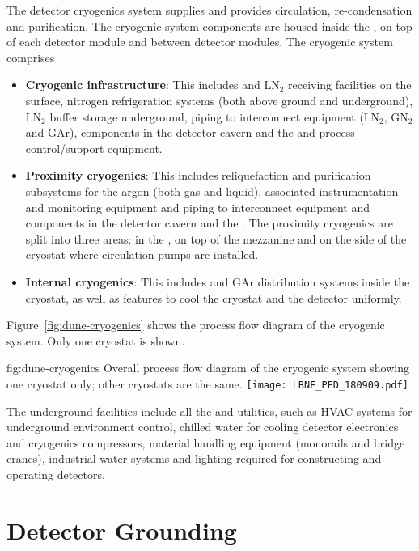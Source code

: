 The detector cryogenics system supplies  and provides
circulation, re-condensation and purification. The cryogenic system
components are housed inside the , on top of each detector module
and between detector modules. The cryogenic system comprises
\begin{itemize}
\item {\bf Cryogenic infrastructure}: This includes  and LN$_2$ receiving
  facilities on the surface, nitrogen refrigeration systems (both
  above ground and underground), LN$_2$ buffer storage
  underground, piping to interconnect equipment (LN$_2$, GN$_2$ and GAr),
  components in the detector cavern and the  and process control/support
  equipment.
\item {\bf Proximity cryogenics}: This includes reliquefaction 
  and
  purification subsystems for the argon (both gas and liquid), associated
  instrumentation and monitoring equipment and  piping to
  interconnect equipment and components in the detector cavern and the
  . The proximity cryogenics are split into three areas: in the
  , on top of the mezzanine and on the side of the cryostat 
  where  circulation pumps are installed.
\item {\bf Internal cryogenics}: This includes  and GAr distribution
  systems inside the cryostat, as well as features to cool the
  cryostat and the detector uniformly.
\end{itemize}
Figure~\ref{fig:dune-cryogenics} shows the process flow diagram of the
 cryogenic system. Only one cryostat is shown.
\begin{dunefigure}{fig:dune-cryogenics}
  {Overall process flow diagram of the cryogenic system showing one
    cryostat only; other cryostats are the same.}
  \texttt{[image: LBNF\_PFD\_180909.pdf]}
\end{dunefigure}


The underground facilities include all the  and utilities,
such as HVAC systems for underground environment control, chilled
water for cooling detector electronics and cryogenics compressors,
material handling equipment (monorails and bridge cranes), industrial
water systems and lighting required for constructing and operating
detectors.


\section{Detector Grounding}
\label{sec:fdsp-coord-faci-grounding}


